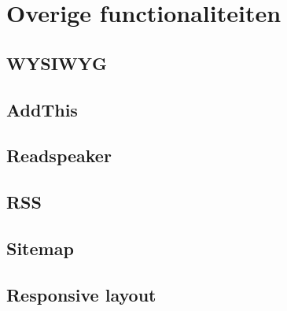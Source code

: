 
\section{Overige functionaliteiten}
\label{sec:overigefunctionaliteiten}

\subsection{WYSIWYG}

\subsection{AddThis}

\subsection{Readspeaker}

\subsection{RSS}

\subsection{Sitemap}

\subsection{Responsive layout}
